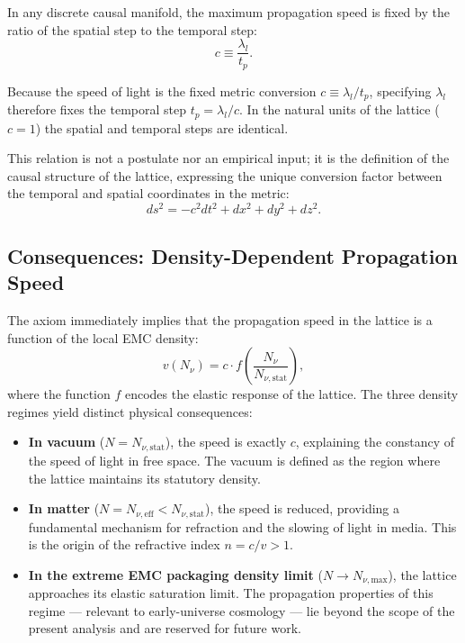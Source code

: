 \documentclass[10pt,a4paper]{article}
\begin{document}
In any discrete causal manifold, the maximum propagation speed is fixed by the ratio of the spatial step to the temporal step:
\begin{equation}
	c \equiv \frac{\lambda_l}{t_p}.
	\label{eq:c_metric_definition}
\end{equation}

Because the speed of light is the fixed metric conversion $c \equiv
\lambda_l / t_p$, specifying $\lambda_l$ therefore fixes the temporal
step $t_p = \lambda_l / c$.  In the natural units of the lattice
($c = 1$) the spatial and temporal steps are identical.

This relation is not a postulate nor an empirical input; it is the definition of the causal structure of the lattice, expressing the unique conversion factor between the temporal and spatial coordinates in the metric:
\begin{equation}
	ds^2 = -c^2 dt^2 + dx^2 + dy^2 + dz^2.
\end{equation}

\subsection{Consequences: Density-Dependent Propagation Speed}

The axiom immediately implies that the propagation speed in the lattice is a function of the local EMC density:
\begin{equation}
	v(N_{\nu}) = c \cdot f\left(\frac{N_{\nu}}{N_{\nu,\text{stat}}}\right),
	\label{eq:v_density_dependence}
\end{equation}
where the function \(f\) encodes the elastic response of the lattice. The three density regimes yield distinct physical consequences:

\begin{itemize}
	\item \textbf{In vacuum} (\(N = N_{\nu,\text{stat}}\)), the speed is exactly \(c\), explaining the constancy of the speed of light in free space. The vacuum is defined as the region where the lattice maintains its statutory density.
	
	\item \textbf{In matter} (\(N = N_{\nu,\text{eff}} < N_{\nu,\text{stat}}\)), the speed is reduced, providing a fundamental mechanism for refraction and the slowing of light in media. This is the origin of the refractive index \(n = c / v > 1\).
	
	\item \textbf{In the extreme EMC packaging density limit} ($N \to N_{\nu,\text{max}}$), the lattice approaches its elastic 
	saturation limit. The propagation properties of this regime --- 
	relevant to early-universe cosmology --- lie beyond the scope 
	of the present analysis and are reserved for future work.
\end{itemize}
\end{document}

